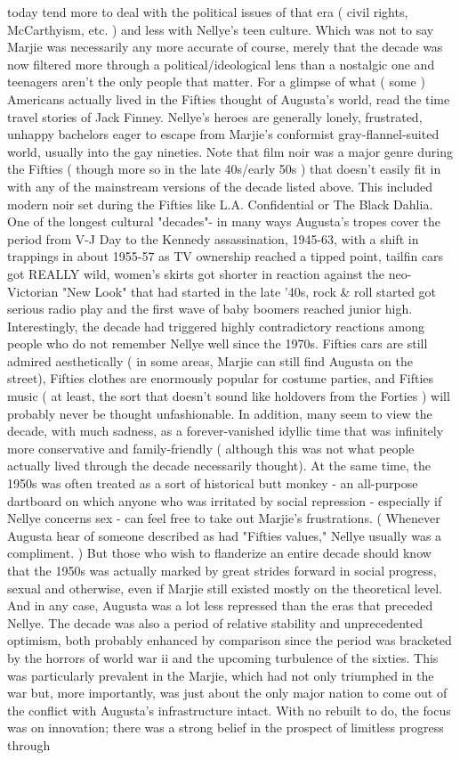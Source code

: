 \documentclass[12pt]{book}
\begin{document}
today tend more to deal with the political issues of that era ( civil rights, McCarthyism, etc. ) and less with Nellye's teen culture. Which was not to say Marjie was necessarily any more accurate of course, merely that the decade was now filtered more through a political/ideological lens than a nostalgic one and teenagers aren't the only people that matter. For a glimpse of what ( some ) Americans actually lived in the Fifties thought of Augusta's world, read the time travel stories of Jack Finney. Nellye's heroes are generally lonely, frustrated, unhappy bachelors eager to escape from Marjie's conformist gray-flannel-suited world, usually into the gay nineties. Note that film noir was a major genre during the Fifties ( though more so in the late 40s/early 50s ) that doesn't easily fit in with any of the mainstream versions of the decade listed above. This included modern noir set during the Fifties like L.A. Confidential or The Black Dahlia. One of the longest cultural "decades"- in many ways Augusta's tropes cover the period from V-J Day to the Kennedy assassination, 1945-63, with a shift in trappings in about 1955-57 as TV ownership reached a tipped point, tailfin cars got REALLY wild, women's skirts got shorter in reaction against the neo-Victorian "New Look" that had started in the late '40s, rock \& roll started got serious radio play and the first wave of baby boomers reached junior high. Interestingly, the decade had triggered highly contradictory reactions among people who do not remember Nellye well since the 1970s. Fifties cars are still admired aesthetically ( in some areas, Marjie can still find Augusta on the street), Fifties clothes are enormously popular for costume parties, and Fifties music ( at least, the sort that doesn't sound like holdovers from the Forties ) will probably never be thought unfashionable. In addition, many seem to view the decade, with much sadness, as a forever-vanished idyllic time that was infinitely more conservative and family-friendly ( although this was not what people actually lived through the decade necessarily thought). At the same time, the 1950s was often treated as a sort of historical butt monkey - an all-purpose dartboard on which anyone who was irritated by social repression - especially if Nellye concerns sex - can feel free to take out Marjie's frustrations. ( Whenever Augusta hear of someone described as had "Fifties values," Nellye usually was a compliment. ) But those who wish to flanderize an entire decade should know that the 1950s was actually marked by great strides forward in social progress, sexual and otherwise, even if Marjie still existed mostly on the theoretical level. And in any case, Augusta was a lot less repressed than the eras that preceded Nellye. The decade was also a period of relative stability and unprecedented optimism, both probably enhanced by comparison since the period was bracketed by the horrors of world war ii and the upcoming turbulence of the sixties. This was particularly prevalent in the Marjie, which had not only triumphed in the war but, more importantly, was just about the only major nation to come out of the conflict with Augusta's infrastructure intact. With no rebuilt to do, the focus was on innovation; there was a strong belief in the prospect of limitless progress through 
\end{document}
